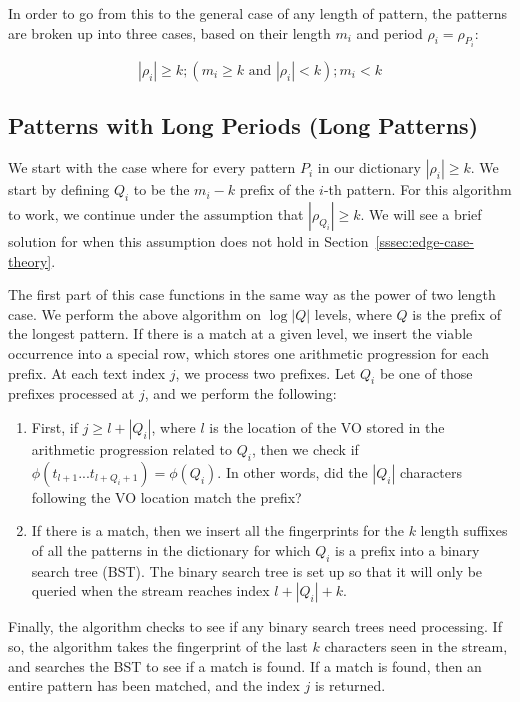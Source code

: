 \documentclass[ %
                    author={Dominic Joseph Moylett},
                    degree={MEng},
                     title={Dictionary Matching with Fingerprints},
                  subtitle={An Empirical Analysis},
                      type={research},
                      year={2015} ]{dissertation}
\begin{document}
In order to go from this to the general case of any length of pattern, the patterns are broken up into three cases, based on their length $m_i$ and period $\rho_i = \rho_{P_i}$:

$$|\rho_i| \geq k; (m_i \geq k \text{ and } |\rho_i| < k); m_i < k$$

\subsection{Patterns with Long Periods (Long Patterns)}
\label{ssec:long-theory}

We start with the case where for every pattern $P_i$ in our dictionary $|\rho_i| \geq k$. We start by defining $Q_i$ to be the $m_i - k$ prefix of the $i$-th pattern. For this algorithm to work, we continue under the assumption that $|\rho_{Q_i}| \geq k$. We will see a brief solution for when this assumption does not hold in Section~\ref{sssec:edge-case-theory}.

The first part of this case functions in the same way as the power of two length case. We perform the above algorithm on $\log|Q|$ levels, where $Q$ is the prefix of the longest pattern. If there is a match at a given level, we insert the viable occurrence into a special row, which stores one arithmetic progression for each prefix. At each text index $j$, we process two prefixes. Let $Q_i$ be one of those prefixes processed at $j$, and we perform the following:

\begin{enumerate}
  \item First, if $j \geq l + |Q_i|$, where $l$ is the location of the VO stored in the arithmetic progression related to $Q_i$, then we check if $\phi(t_{l+1}...t_{l+Q_i+1}) = \phi(Q_i)$. In other words, did the $|Q_i|$ characters following the VO location match the prefix?
  \item If there is a match, then we insert all the fingerprints for the $k$ length suffixes of all the patterns in the dictionary for which $Q_i$ is a prefix into a binary search tree (BST). The binary search tree is set up so that it will only be queried when the stream reaches index $l + |Q_i| + k$.
\end{enumerate}

Finally, the algorithm checks to see if any binary search trees need processing. If so, the algorithm takes the fingerprint of the last $k$ characters seen in the stream, and searches the BST to see if a match is found. If a match is found, then an entire pattern has been matched, and the index $j$ is returned.
\end{document}
